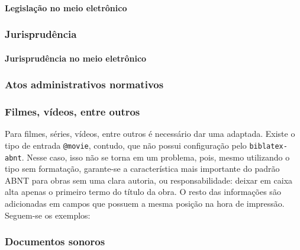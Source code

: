 
\paragraph{Legislação no meio eletrônico}


\subsubsection{Jurisprudência}


\paragraph{Jurisprudência no meio eletrônico}

\subsubsection{Atos administrativos normativos}


\subsubsection{Filmes, vídeos, entre outros}
Para filmes, séries, vídeos, entre outros é necessário dar uma adaptada. Existe o tipo de entrada \texttt{@movie}, contudo, que não possui configuração pelo \texttt{biblatex-abnt}. Nesse caso, isso não se torna em um problema, pois, mesmo utilizando o tipo sem formatação, garante-se a característica mais importante do padrão ABNT para obras sem uma clara autoria, ou responsabilidade: deixar em caixa alta apenas o primeiro termo do título da obra. O resto das informações são adicionadas em campos que possuem a mesma posição na hora de impressão. Seguem-se os exemplos:




\subsubsection{Documentos sonoros}


